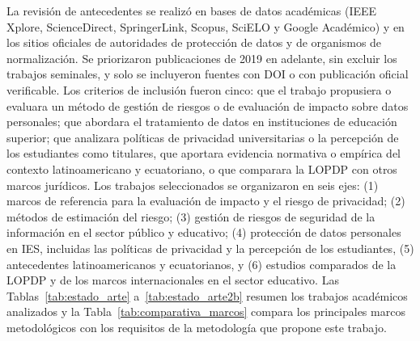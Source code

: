La revisión de antecedentes se realizó en bases de datos académicas (IEEE Xplore, ScienceDirect, SpringerLink, Scopus, SciELO y Google Académico) y en los sitios oficiales de autoridades de protección de datos y de organismos de normalización. Se priorizaron publicaciones de 2019 en adelante, sin excluir los trabajos seminales, y solo se incluyeron fuentes con DOI o con publicación oficial verificable. Los criterios de inclusión fueron cinco: que el trabajo propusiera o evaluara un método de gestión de riesgos o de evaluación de impacto sobre datos personales; que abordara el tratamiento de datos en instituciones de educación superior; que analizara políticas de privacidad universitarias o la percepción de los estudiantes como titulares, que aportara evidencia normativa o empírica del contexto latinoamericano y ecuatoriano, o que comparara la LOPDP con otros marcos jurídicos. Los trabajos seleccionados se organizaron en seis ejes: (1) marcos de referencia para la evaluación de impacto y el riesgo de privacidad; (2) métodos de estimación del riesgo; (3) gestión de riesgos de seguridad de la información en el sector público y educativo; (4) protección de datos personales en IES, incluidas las políticas de privacidad y la percepción de los estudiantes, (5) antecedentes latinoamericanos y ecuatorianos, y (6) estudios comparados de la LOPDP y de los marcos internacionales en el sector educativo. Las Tablas~\ref{tab:estado_arte} a~\ref{tab:estado_arte2b} resumen los trabajos académicos analizados y la Tabla~\ref{tab:comparativa_marcos} compara los principales marcos metodológicos con los requisitos de la metodología que propone este trabajo.

